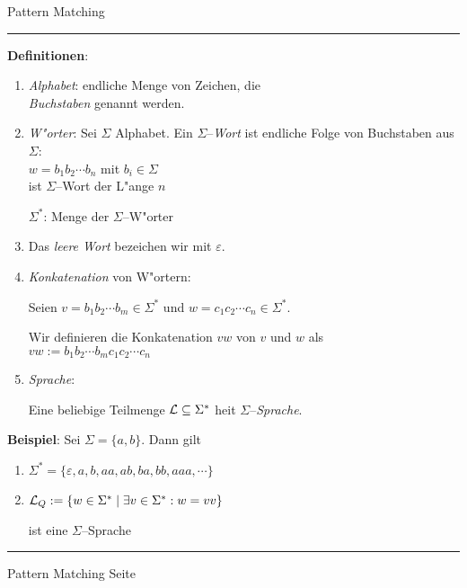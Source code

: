 \documentclass{slides}
\newcounter{mypage}
\begin{document}
\begin{center}
Pattern Matching
\end{center}


\rule{17cm}{1mm}

\footnotesize
\textbf{Definitionen}:
\begin{enumerate}
\item \emph{Alphabet}: endliche Menge von Zeichen, die \\
      \emph{Buchstaben} genannt werden.
\item \emph{W"orter}:  Sei $\Sigma$ Alphabet.  Ein $\Sigma$--\emph{Wort} ist endliche Folge von
      Buchstaben aus $\Sigma$: \\[0.3cm]
      \hspace*{1.3cm} $w = b_1b_2 \cdots b_n$ \quad mit $b_i \in \Sigma$ \\[0.3cm]
      ist $\Sigma$--Wort der L"ange $n$

      $\Sigma^*$: Menge der $\Sigma$--W"orter
\item Das \emph{leere Wort} bezeichen wir mit $\varepsilon$.
\item \emph{Konkatenation} von W"ortern: 

      Seien $v=b_1b_2 \cdots b_m \in \Sigma^*$ und $w=c_1c_2 \cdots c_n \in \Sigma^*$.

      Wir definieren die Konkatenation $vw$ von $v$ und $w$ als \\[0.3cm]
      \hspace*{1.3cm} $vw := b_1b_2 \cdots b_mc_1c_2 \cdots c_n$
\item \emph{Sprache}:

      Eine beliebige Teilmenge ${\cal L} \subseteq \Sigma^*$ hei\3t $\Sigma$--\emph{Sprache}.
\end{enumerate}
\textbf{Beispiel}: Sei $\Sigma = \{a,b\}$.  Dann gilt 
\begin{enumerate}
\item $\Sigma^* = \{ \varepsilon, a, b, aa, ab, ba, bb, aaa, \cdots \}$ 
\item ${\cal L}_{Q} := \{ w \in \Sigma^* \;|\; \exists v \in \Sigma^*: w = vv \}$ 

      ist eine $\Sigma$--Sprache
\end{enumerate}
\hspace*{1.3cm} 


\vspace*{0.2cm}

\scriptsize

\vspace*{\fill}
\tiny \addtocounter{mypage}{1}
\rule{17cm}{1mm}
Pattern Matching  \hspace*{\fill} Seite 



\end{document}
